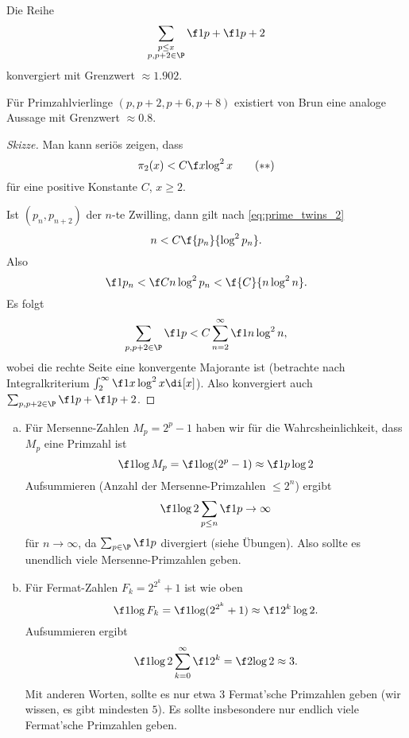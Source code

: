 \begin{st}[V. Brun, 1913] \label{7.14}
	Die Reihe
	\[
		\sum_{\substack{p \le x \\ p,p+2 \in \P}} \f 1p + \f 1{p+2}
	\]
	konvergiert mit Grenzwert $\approx 1.902$.
	\begin{note}
		Für Primzahlvierlinge $(p, p+2, p+6, p+8)$ existiert von Brun eine analoge Aussage mit Grenzwert $\approx 0.8$.
	\end{note}
	\begin{proof}[Skizze]
		Man kann seriös zeigen, dass
		\begin{equation} \label{eq:prime_twins_2}
			\pi_2(x) < C \f x{\log^2 x} \tag{$\ast\ast$}
		\end{equation}
		für eine positive Konstante $C$, $x \ge 2$.

		Ist $(p_n, p_{n+2})$ der $n$-te Zwilling, dann gilt nach \eqref{eq:prime_twins_2}
		\[
			n < C \f{p_n}{\log^2 p_n}.
		\]
		Also
		\[
			\f 1{p_n} < \f C{n \log^2 p_n} < \f {C}{n \log^2 n}.
		\]
		Es folgt
		\[
			\sum_{p,p+2 \in \P} \f 1p
			< C \sum_{n=2}^\infty \f 1{n \log^2 n},
		\]
		wobei die rechte Seite eine konvergente Majorante ist (betrachte nach Integralkriterium $\int_2^\infty \f 1{x \log^2 x} \di[x]$).
		Also konvergiert auch $\sum_{p,p+2 \in \P} \f 1p + \f 1{p+2}$.
	\end{proof}
\end{st}

\begin{nt} \label{7.15}
	\begin{enumerate}[a)]
		\item
			Für Mersenne-Zahlen $M_p = 2^p - 1$ haben wir für die Wahrcsheinlichkeit, dass $M_p$ eine Primzahl ist
			\[
				\f 1{\log M_p}
				= \f 1{\log (2^p - 1)}
				\approx \f 1{p \log 2}
			\]
			Aufsummieren (Anzahl der Mersenne-Primzahlen $\le 2^n$) ergibt
			\[
				\f 1{\log 2} \sum_{p \le n} \f 1p \to \infty
			\]
			für $n \to \infty$, da $\sum_{p \in \P} \f 1p$ divergiert (siehe Übungen).
			Also sollte es unendlich viele Mersenne-Primzahlen geben.
		\item
			Für Fermat-Zahlen $F_k = 2^{2^k} + 1$ ist wie oben
			\[
				\f 1{\log F_k}
				= \f 1{\log(2^{2^k} + 1)}
				\approx \f 1{2^k \log 2}.
			\]
			Aufsummieren ergibt
			\[
				\f 1{\log 2} \sum_{k=0}^\infty \f 1{2^k} = \f 2{\log 2} \approx 3.
			\]
			Mit anderen Worten, sollte es nur etwa $3$ Fermat'sche Primzahlen geben (wir wissen, es gibt mindesten $5$).
			Es sollte insbesondere nur endlich viele Fermat'sche Primzahlen geben.
	\end{enumerate}
\end{nt}

